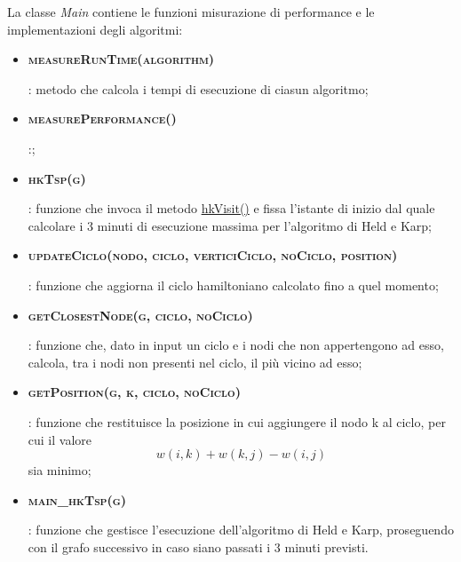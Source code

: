 La classe \textit{Main} contiene le funzioni misurazione di performance e le implementazioni degli algoritmi:

\begin{itemize}

    \item \hypertarget{measureruntime}{\textbf{\textsc{measureRunTime(algorithm)}}}: metodo che calcola i tempi di esecuzione di ciasun algoritmo;
    
    \item \hypertarget{measureperformance}{\textbf{\textsc{measurePerformance()}}}:;
    
    \item \hypertarget{hktsp}{\textbf{\textsc{hkTsp(g)}}}: funzione che invoca il metodo \hyperlink{hkvisit}{hkVisit()} e fissa l'istante di inizio dal quale calcolare i 3 minuti di esecuzione massima per l'algoritmo di Held e Karp;
    
    \item \hypertarget{updateciclo}{\textbf{\textsc{updateCiclo(nodo, ciclo, verticiCiclo, noCiclo, position)}}}: funzione che aggiorna il ciclo hamiltoniano calcolato fino a quel momento;
    
    \item \hypertarget{getclosestnode}{\textbf{\textsc{getClosestNode(g, ciclo, noCiclo)}}}: funzione che, dato in input un ciclo e i nodi che non appertengono ad esso, calcola, tra i nodi non presenti nel ciclo, il più vicino ad esso;
    
    \item \hypertarget{getposition}{\textbf{\textsc{getPosition(g, k, ciclo, noCiclo)}}}: funzione che restituisce la posizione in cui aggiungere il nodo k al ciclo, per cui  il valore \[w(i, k) + w(k, j) - w(i, j)\] sia minimo;
    
    \item \hypertarget{mainhk}{\textbf{\textsc{main\_hkTsp(g)}}}: funzione che gestisce l'esecuzione dell'algoritmo di Held e Karp, proseguendo con il grafo successivo in caso siano passati i 3 minuti previsti.

\end{itemize}


\newpage